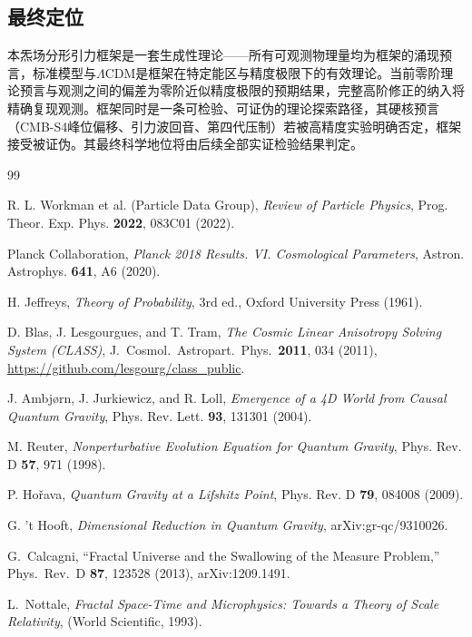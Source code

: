 \documentclass[12pt,a4paper,twocolumn]{article}
\begin{document}
\subsection{最终定位}
本炁场分形引力框架是一套生成性理论——所有可观测物理量均为框架的涌现预言，标准模型与$\Lambda$CDM是框架在特定能区与精度极限下的有效理论。当前零阶理论预言与观测之间的偏差为零阶近似精度极限的预期结果，完整高阶修正的纳入将精确复现观测。框架同时是一条可检验、可证伪的理论探索路径，其硬核预言（CMB-S4峰位偏移、引力波回音、第四代压制）若被高精度实验明确否定，框架接受被证伪。其最终科学地位将由后续全部实证检验结果判定。

\begin{thebibliography}{99}

R. L. Workman et al. (Particle Data Group), \textit{Review of Particle Physics}, Prog. Theor. Exp. Phys. \textbf{2022}, 083C01 (2022).

Planck Collaboration, \textit{Planck 2018 Results. VI. Cosmological Parameters}, Astron. Astrophys. \textbf{641}, A6 (2020).

H. Jeffreys, \textit{Theory of Probability}, 3rd ed., Oxford University Press (1961).

D. Blas, J. Lesgourgues, and T. Tram, \textit{The Cosmic Linear Anisotropy Solving System (CLASS)}, J.~Cosmol.~Astropart.~Phys.~\textbf{2011}, 034 (2011), \url{https://github.com/lesgourg/class_public}.

J. Ambjørn, J. Jurkiewicz, and R. Loll, \textit{Emergence of a 4D World from Causal Quantum Gravity}, Phys. Rev. Lett. \textbf{93}, 131301 (2004).

M. Reuter, \textit{Nonperturbative Evolution Equation for Quantum Gravity}, Phys. Rev. D \textbf{57}, 971 (1998).

P. Hořava, \textit{Quantum Gravity at a Lifshitz Point}, Phys. Rev. D \textbf{79}, 084008 (2009).

G. 't Hooft, \textit{Dimensional Reduction in Quantum Gravity}, arXiv:gr-qc/9310026.

G.~Calcagni,
``Fractal Universe and the Swallowing of the Measure Problem,''
Phys.\ Rev.\ D \textbf{87}, 123528 (2013), arXiv:1209.1491.

L.~Nottale,
\textit{Fractal Space-Time and Microphysics: Towards a Theory of Scale Relativity},
(World Scientific, 1993).


\end{thebibliography}
\end{document}
